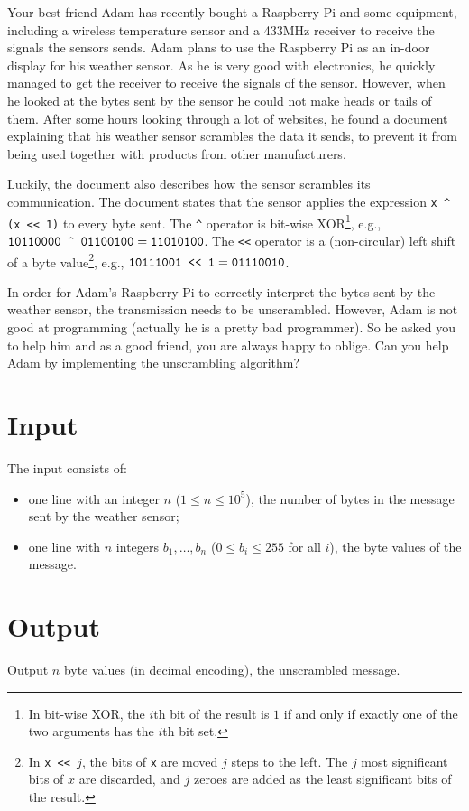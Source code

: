 
%
Your best friend Adam has recently bought a Raspberry Pi and some equipment, including a wireless temperature sensor and a 433MHz receiver to receive the signals the sensors sends.
Adam plans to use the Raspberry Pi as an in-door display for his weather sensor.
As he is very good with electronics, he quickly managed to get the receiver to receive the signals of the sensor.
However, when he looked at the bytes sent by the sensor he could not make heads or tails of them.
After some hours looking through a lot of websites, he found a document explaining that his weather sensor scrambles the data it sends, to prevent it from being used together with products from other manufacturers.

Luckily, the document also describes how the sensor scrambles its communication.
The document states that the sensor applies the expression \verb|x ^ (x << 1)|
to every byte sent.  The \verb|^| operator is bit-wise XOR\footnote{In bit-wise
XOR, the $i$th bit of the result is $1$ if and only if exactly one of the two
arguments has the $i$th bit set.}, e.g., $\verb|10110000 ^ 01100100| =
\verb|11010100|$.
The \verb|<<| operator is a (non-circular) left shift of a byte value\footnote{In
\texttt{x <{}< $j$}, the bits of \texttt{x} are moved $j$ steps to the left.
The $j$ most significant bits of $x$ are discarded, and $j$ zeroes are added
as the least significant bits of the result.}, e.g.,
$\verb|10111001 << 1| = \verb|01110010|$.

In order for Adam's Raspberry Pi to correctly interpret the bytes sent by the weather sensor, the transmission needs to be unscrambled.
However, Adam is not good at programming (actually he is a pretty bad programmer). So he asked you to help him and as a good friend, you are always happy to oblige.
Can you help Adam by implementing the unscrambling algorithm?


\section*{Input}

The input consists of:
\begin{itemize}
\item one line with an integer $n$ ($1 \le n \le 10^5$), the number of bytes in the message sent by the weather sensor;
\item one line with $n$ integers $b_1, \ldots, b_n$ ($0 \leq b_i \leq 255$ for all $i$), the byte values of the message.
\end{itemize}

\section*{Output}

Output $n$ byte values (in decimal encoding), the unscrambled message.
